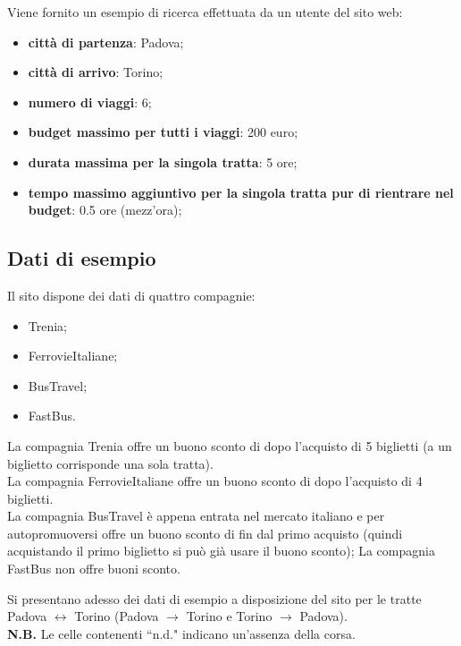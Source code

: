 \documentclass[main.tex]{subfiles}
\begin{document}
Viene fornito un esempio di ricerca effettuata da un utente del sito web:
\begin{itemize}
    \item \textbf{città di partenza}: Padova;
    \item \textbf{città di arrivo}: Torino;
    \item \textbf{numero di viaggi}: 6;
    \item \textbf{budget massimo per tutti i viaggi}: 200 euro;
    \item \textbf{durata massima per la singola tratta}: 5 ore;
    \item \textbf{tempo massimo aggiuntivo per la singola tratta pur di rientrare nel budget}: 0.5 ore (mezz'ora);
\end{itemize}

\clearpage

\subsection{Dati di esempio}
Il sito dispone dei dati di quattro compagnie:
\begin{itemize}
    \item Trenia;
    \item FerrovieItaliane;
    \item BusTravel;
    \item FastBus.
\end{itemize}
La compagnia Trenia offre un buono sconto di  dopo l'acquisto di 5 biglietti (a un biglietto corrisponde una sola tratta).\\
La compagnia FerrovieItaliane offre un buono sconto di  dopo l'acquisto di 4 biglietti.\\
La compagnia BusTravel è appena entrata nel mercato italiano e per autopromuoversi offre un buono sconto di  fin dal primo acquisto (quindi acquistando il primo biglietto si può già usare il buono sconto);
La compagnia FastBus non offre buoni sconto.

Si presentano adesso dei dati di esempio a disposizione del sito per le tratte Padova $\leftrightarrow$ Torino (Padova $\rightarrow$ Torino e Torino $\rightarrow$ Padova).\\
\textbf{N.B.} Le celle contenenti ``n.d." indicano un'assenza della corsa.
\end{document}
